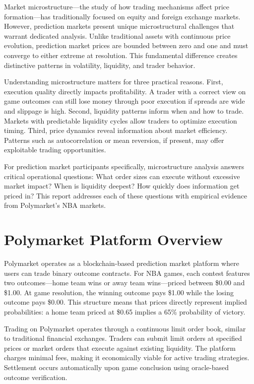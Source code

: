 Market microstructure---the study of how trading mechanisms affect price formation---has traditionally focused on equity and foreign exchange markets. However, prediction markets present unique microstructural challenges that warrant dedicated analysis. Unlike traditional assets with continuous price evolution, prediction market prices are bounded between zero and one and must converge to either extreme at resolution. This fundamental difference creates distinctive patterns in volatility, liquidity, and trader behavior.

Understanding microstructure matters for three practical reasons. First, execution quality directly impacts profitability. A trader with a correct view on game outcomes can still lose money through poor execution if spreads are wide and slippage is high. Second, liquidity patterns inform when and how to trade. Markets with predictable liquidity cycles allow traders to optimize execution timing. Third, price dynamics reveal information about market efficiency. Patterns such as autocorrelation or mean reversion, if present, may offer exploitable trading opportunities.

For prediction market participants specifically, microstructure analysis answers critical operational questions: What order sizes can execute without excessive market impact? When is liquidity deepest? How quickly does information get priced in? This report addresses each of these questions with empirical evidence from Polymarket's NBA markets.

\section{Polymarket Platform Overview}

Polymarket operates as a blockchain-based prediction market platform where users can trade binary outcome contracts. For NBA games, each contest features two outcomes---home team wins or away team wins---priced between \$0.00 and \$1.00. At game resolution, the winning outcome pays \$1.00 while the losing outcome pays \$0.00. This structure means that prices directly represent implied probabilities: a home team priced at \$0.65 implies a 65\% probability of victory.

Trading on Polymarket operates through a continuous limit order book, similar to traditional financial exchanges. Traders can submit limit orders at specified prices or market orders that execute against existing liquidity. The platform charges minimal fees, making it economically viable for active trading strategies. Settlement occurs automatically upon game conclusion using oracle-based outcome verification.

